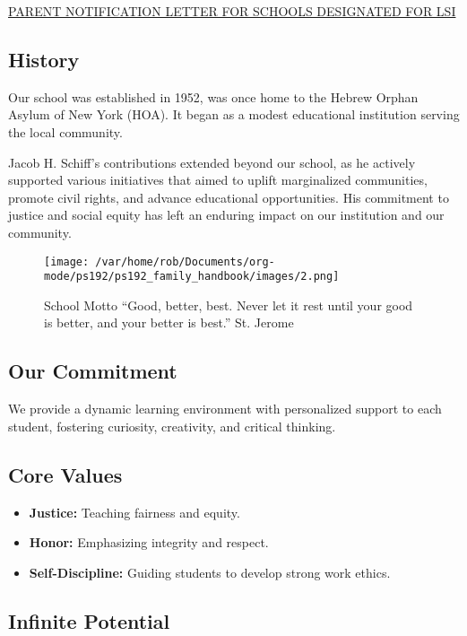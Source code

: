 \documentclass[letterpaper, 11pt]{article}
\begin{document}
\href{https://4.files.edl.io/760e/02/07/24/000734-b96f6af6-0f19-4829-999f-2eb23313280d.pdf}{PARENT NOTIFICATION LETTER FOR SCHOOLS DESIGNATED FOR LSI}

\subsection{History}
\label{sec:org114084b}

Our school was established in 1952, was once home to the Hebrew Orphan Asylum of New York (HOA). It began as a modest educational institution serving the local community.

Jacob H. Schiff’s contributions extended beyond our school, as he actively supported various initiatives that aimed to uplift marginalized communities, promote civil rights, and advance educational opportunities. His commitment to justice and social equity has left an enduring impact on our institution and our community.

\begin{figure}[htbp]
\centering
\texttt{[image: /var/home/rob/Documents/org-mode/ps192/ps192\_family\_handbook/images/2.png]}
\caption{School Motto ``Good, better, best. Never let it rest until your good is better, and your better is best.'' St. Jerome}
\end{figure}

\subsection{Our Commitment}
\label{sec:orga4becc3}

We provide a dynamic learning environment with personalized support to each student, fostering curiosity, creativity, and critical thinking.

\subsection{Core Values}
\label{sec:org1cc9ba8}

\begin{itemize}
\item \textbf{\textbf{Justice:}} Teaching fairness and equity.
\item \textbf{\textbf{Honor:}} Emphasizing integrity and respect.
\item \textbf{\textbf{Self-Discipline:}} Guiding students to develop strong work ethics.
\end{itemize}

\subsection{Infinite Potential}
\label{sec:org08d2480}
\end{document}
